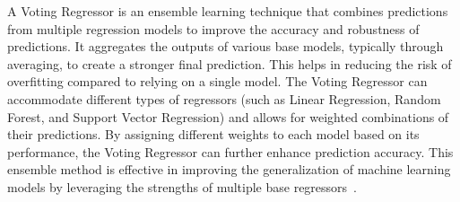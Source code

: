 A Voting Regressor is an ensemble learning technique that combines predictions from multiple regression models to improve
the accuracy and robustness of predictions. It aggregates the outputs of various base models, typically through averaging,
to create a stronger final prediction. This helps in reducing the risk of overfitting compared to relying on a single model.
The Voting Regressor can accommodate different types of regressors (such as Linear Regression, Random Forest, and Support
Vector Regression) and allows for weighted combinations of their predictions. By assigning different weights to each model
based on its performance, the Voting Regressor can further enhance prediction accuracy. This ensemble method is effective
in improving the generalization of machine learning models by leveraging the strengths of multiple base
regressors\ \cite{votingRegressorMedium}.